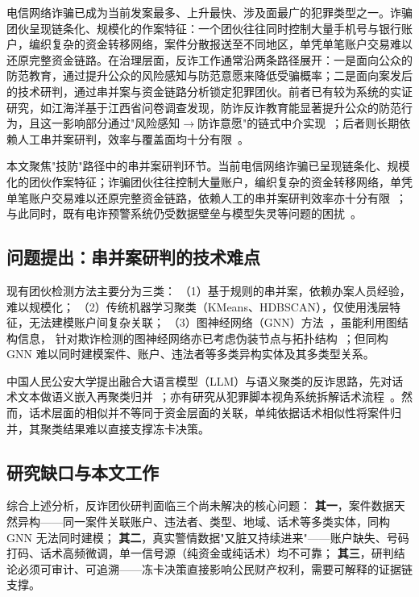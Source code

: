 \documentclass[12pt,a4paper]{ctexart}
\begin{document}
电信网络诈骗已成为当前发案最多、上升最快、涉及面最广的犯罪类型之一。诈骗团伙呈现链条化、规模化的作案特征：一个团伙往往同时控制大量手机号与银行账户，编织复杂的资金转移网络，案件分散报送至不同地区，单凭单笔账户交易难以还原完整资金链路。在治理层面，反诈工作通常沿两条路径展开：一是面向公众的防范教育，通过提升公众的风险感知与防范意愿来降低受骗概率；二是面向案发后的技术研判，通过串并案与资金链路分析锁定犯罪团伙。前者已有较为系统的实证研究，如江海洋基于江西省问卷调查发现，防诈反诈教育能显著提升公众的防范行为，且这一影响部分通过"风险感知$\to$防诈意愿"的链式中介实现~\cite{jiang2025antifraud}；后者则长期依赖人工串并案研判，效率与覆盖面均十分有限~\cite{wu2023moneylaunder}。

本文聚焦"技防"路径中的串并案研判环节。当前电信网络诈骗已呈现链条化、规模化的团伙作案特征；诈骗团伙往往控制大量账户，编织复杂的资金转移网络，单凭单笔账户交易难以还原完整资金链路，依赖人工的串并案研判效率亦十分有限~\cite{wu2023moneylaunder}；与此同时，既有电诈预警系统仍受数据壁垒与模型失灵等问题的困扰~\cite{zhuang2025warning}。

\subsection{问题提出：串并案研判的技术难点}

现有团伙检测方法主要分为三类：
（1）基于规则的串并案，依赖办案人员经验，难以规模化；
（2）传统机器学习聚类（KMeans、HDBSCAN），仅使用浅层特征，无法建模账户间复杂关联；
（3）图神经网络（GNN）方法~\cite{kipf2017gcn,hamilton2017graphsage,zhang2024ciesgnn}，虽能利用图结构信息，
针对欺诈检测的图神经网络亦已考虑伪装节点与拓扑结构~\cite{dou2020caregnn}；但同构 GNN 难以同时建模案件、账户、违法者等多类异构实体及其多类型关系。

中国人民公安大学提出融合大语言模型（LLM）与语义聚类的反诈思路，先对话术文本做语义嵌入再聚类归并~\cite{shi2025llmsemantic}；亦有研究从犯罪脚本视角系统拆解话术流程~\cite{yang2025crimescript}。然而，话术层面的相似并不等同于资金层面的关联，单纯依据话术相似性将案件归并，其聚类结果难以直接支撑冻卡决策。

\subsection{研究缺口与本文工作}

综合上述分析，反诈团伙研判面临三个尚未解决的核心问题：
\textbf{其一}，案件数据天然异构——同一案件关联账户、违法者、类型、地域、话术等多类实体，同构 GNN 无法同时建模；
\textbf{其二}，真实警情数据"又脏又持续进来"——账户缺失、号码打码、话术高频微调，单一信号源（纯资金或纯话术）均不可靠；
\textbf{其三}，研判结论必须可审计、可追溯——冻卡决策直接影响公民财产权利，需要可解释的证据链支撑。
\end{document}
